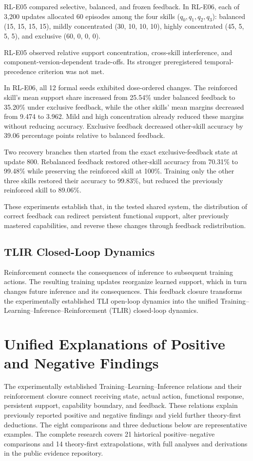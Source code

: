 \documentclass[12pt,letterpaper]{article}
\begin{document}
RL-E05 compared selective, balanced, and frozen feedback. In RL-E06, each of 3,200 updates allocated 60 episodes among the four skills ($q_0,q_1,q_2,q_3$): balanced (15, 15, 15, 15), mildly concentrated (30, 10, 10, 10), highly concentrated (45, 5, 5, 5), and exclusive (60, 0, 0, 0).



RL-E05 observed relative support concentration, cross-skill interference, and component-version-dependent trade-offs. Its stronger preregistered temporal-precedence criterion was not met.

In RL-E06, all 12 formal seeds exhibited dose-ordered changes. The reinforced skill's mean support share increased from 25.54\% under balanced feedback to 35.20\% under exclusive feedback, while the other skills' mean margins decreased from 9.474 to 3.962. Mild and high concentration already reduced these margins without reducing accuracy. Exclusive feedback decreased other-skill accuracy by 39.06 percentage points relative to balanced feedback.

Two recovery branches then started from the exact exclusive-feedback state at update 800. Rebalanced feedback restored other-skill accuracy from 70.31\% to 99.48\% while preserving the reinforced skill at 100\%. Training only the other three skills restored their accuracy to 99.83\%, but reduced the previously reinforced skill to 89.06\%.

These experiments establish that, in the tested shared system, the distribution of correct feedback can redirect persistent functional support, alter previously mastered capabilities, and reverse these changes through feedback redistribution.

\subsection{TLIR Closed-Loop Dynamics}
Reinforcement connects the consequences of inference to subsequent training actions. The resulting training updates reorganize learned support, which in turn changes future inference and its consequences. This feedback closure transforms the experimentally established TLI open-loop dynamics into the unified Training--Learning--Inference--Reinforcement (TLIR) closed-loop dynamics.

\section{Unified Explanations of Positive and Negative Findings}
\label{sec:unified}
The experimentally established Training--Learning--Inference relations and their reinforcement closure connect receiving state, actual action, functional response, persistent support, capability boundary, and feedback. These relations explain previously reported positive and negative findings and yield further theory-first deductions. The eight comparisons and three deductions below are representative examples. The complete research covers 21 historical positive--negative comparisons and 14 theory-first extrapolations, with full analyses and derivations in the public evidence repository.
\end{document}

